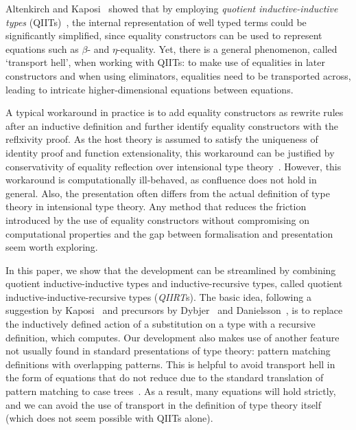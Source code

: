 \documentclass[a4paper,UKenglish,numberwithinsect,cleveref,thm-restate]{lipics-v2021}
\begin{document}
Altenkirch and Kaposi~\cite{Altenkirch2016a} showed that by employing \emph{quotient inductive-inductive types} (QIITs)~\cite{Altenkirch2018}, the internal representation of well typed terms could be significantly simplified, since equality constructors can be used to represent equations such as $\beta$- and $\eta$-equality.
%
Yet, there is a general phenomenon, called `transport hell', when working with QIITs: to make use of equalities in later constructors and when using eliminators, equalities need to be transported across,
leading to intricate higher-dimensional equations between equations.

A typical workaround in practice \cite{Kaposi2019,Kaposi2024a} is to add equality constructors as rewrite rules after an inductive definition and further identify equality constructors with the reflxivity proof.
%
As the host theory is assumed to satisfy the uniqueness of identity proof and function extensionality, this workaround can be justified by conservativity of equality reflection over intensional type theory~\cite{Hofmann1996,Winterhalter2019,Kapulkin2025}.
%
However, this workaround is computationally ill-behaved, as confluence does not hold in general.
Also, the presentation often differs from the actual definition of type theory in intensional type theory.
%
Any method that reduces the friction introduced by the use of equality constructors without compromising on computational properties and the gap between formalisation and presentation seem worth exploring.
%

In this paper, we show that the development can be streamlined by combining quotient inductive-inductive types and inductive-recursive types, called quotient inductive-inductive-recursive types (\emph{QIIRT}s).
%
The basic idea, following a suggestion by Kaposi~\cite{Kaposi2023} and precursors by Dybjer~\cite{Dybjer1996} and Danielsson~\cite{Danielsson2006}, is to replace the inductively defined action of a substitution on a type with a recursive definition, which computes.
%
Our development also makes use of another feature not usually found in standard presentations of type theory: pattern matching definitions with overlapping patterns.
%
This is helpful to avoid transport hell in the form of equations that do not reduce due to the standard translation of pattern matching to case trees~\cite{Cockx2017}.
%
As a result, many equations will hold strictly, and we can avoid the use of transport in the definition of type theory itself (which does not seem possible with QIITs alone).
%
\end{document}
